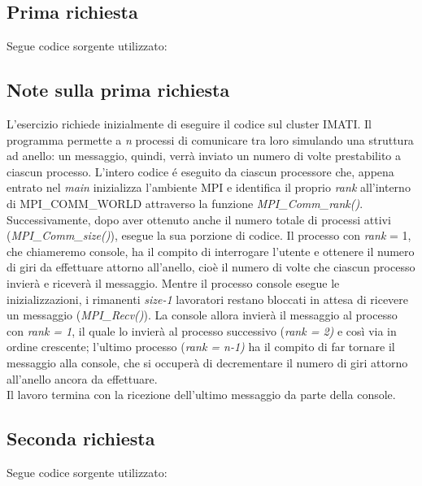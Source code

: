 \subsection*{Prima richiesta}
Segue codice sorgente utilizzato:



 \subsection*{Note sulla prima richiesta}
L'esercizio richiede inizialmente di eseguire il codice sul cluster IMATI. Il programma permette a \emph{n} processi di comunicare tra loro simulando una struttura ad anello: un messaggio, quindi, verr\`a inviato un numero di volte prestabilito a ciascun processo.
L'intero codice \'e eseguito da ciascun processore che, appena entrato nel \emph{main} inizializza l'ambiente MPI e identifica il proprio \emph{rank} all'interno di MPI\_COMM\_WORLD attraverso la funzione \emph{MPI\_Comm\_rank()}. 
Successivamente, dopo aver ottenuto anche il numero totale di processi attivi (\emph{MPI\_Comm\_size()}), esegue la sua porzione di codice.
Il processo con \emph{rank} = 1, che chiameremo console, ha il compito di interrogare l'utente e ottenere il numero di giri da effettuare attorno all'anello, cio\`e il numero di volte che ciascun processo invier\`a e ricever\`a il messaggio.
Mentre il processo console esegue le inizializzazioni, i rimanenti \emph{size-1} lavoratori restano bloccati in attesa di ricevere un messaggio (\emph{MPI\_Recv()}). La console allora invier\`a il messaggio al processo con \emph{rank = 1}, il quale lo invier\`a al processo successivo (\emph{rank = 2)} e cos\`i via in ordine crescente; l'ultimo processo (\emph{rank = n-1)} ha il compito di far tornare il messaggio alla console, che si occuper\`a di decrementare il numero di giri attorno all'anello ancora da effettuare. \\
Il lavoro termina con la ricezione dell'ultimo messaggio da parte della console.

\newpage

\subsection*{Seconda richiesta}
Segue codice sorgente utilizzato:



\subsection*{}


